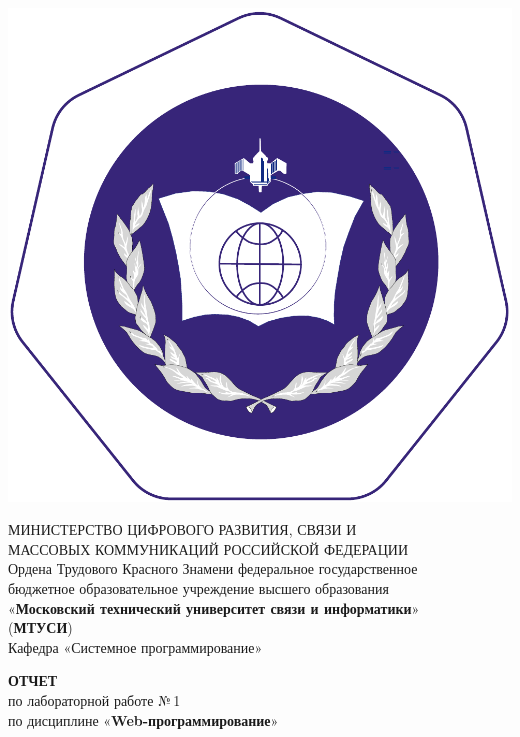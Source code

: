 \documentclass[14pt]{extarticle}
\begin{document}
{\par\centering %

\includegraphics[width=0.12\linewidth]{logo.pdf} %

МИНИСТЕРСТВО ЦИФРОВОГО РАЗВИТИЯ, СВЯЗИ И\\МАССОВЫХ КОММУНИКАЦИЙ РОССИЙСКОЙ ФЕДЕРАЦИИ\\[5mm] %

Ордена Трудового Красного Знамени федеральное государственное\\ бюджетное образовательное учреждение высшего образования\\ «\textbf{Московский технический университет связи и информатики}»\\(\textbf{МТУСИ})\\[5mm] 
	
Кафедра «Системное программирование»
\par}


\vfill\vfill %

{\par\centering
\textbf{ОТЧЕТ}\\ по лабораторной работе №\,1\\[5mm]

по дисциплине «\textbf{Web-программирование}»
\par}
\end{document}

